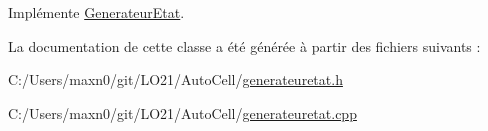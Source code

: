 Implémente \mbox{\hyperlink{class_generateur_etat_a0698d6706e0aaa2e597bdaf280806835}{Generateur\+Etat}}.



La documentation de cette classe a été générée à partir des fichiers suivants \+:\begin{DoxyCompactItemize}
\item 
C\+:/\+Users/maxn0/git/\+L\+O21/\+Auto\+Cell/\mbox{\hyperlink{generateuretat_8h}{generateuretat.\+h}}\item 
C\+:/\+Users/maxn0/git/\+L\+O21/\+Auto\+Cell/\mbox{\hyperlink{generateuretat_8cpp}{generateuretat.\+cpp}}\end{DoxyCompactItemize}
